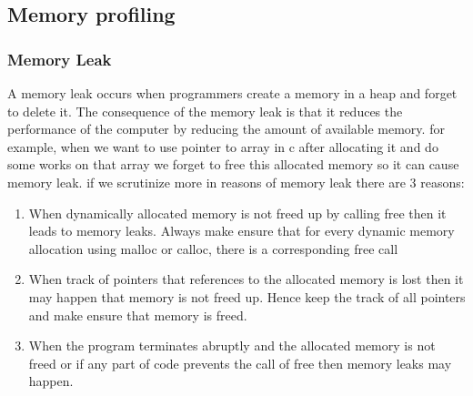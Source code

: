 \documentclass[titlepage]{article}
\begin{document}
	\subsection{Memory profiling}
	\subsubsection{Memory Leak}
	A memory leak occurs when programmers create a memory in a heap and forget to delete it. The consequence of the memory leak is that it reduces the performance of the computer by reducing the amount of available memory. for example, when we want to use pointer to array in c after allocating it and do some works on that array we forget to free this allocated memory so it can cause memory leak. if we scrutinize more in reasons of memory leak there are 3 reasons:
	\begin{enumerate}
		\item When dynamically allocated memory is not freed up by calling free then it leads to memory leaks. Always make ensure that for every dynamic memory allocation using malloc or calloc, there is a corresponding free call
		\item When track of pointers that references to the allocated memory is lost then it may happen that memory is not freed up. Hence keep the track of all pointers and make ensure that memory is freed.
		\item When the program terminates abruptly and the allocated memory is not freed or if any part of code prevents the call of free then memory leaks may happen.
	\end{enumerate}
\end{document}
